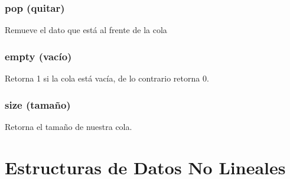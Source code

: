 \documentclass[letterpaper,10pt,spanish]{sphinxmanual}
\begin{document}
\subsubsection{pop (quitar)}
\label{\detokenize{edd/lineales:id2}}
Remueve el dato que está al frente de la cola

\begin{sphinxVerbatim}[commandchars=\\\{\},numbers=left,firstnumber=1,stepnumber=1]
\end{sphinxVerbatim}


\subsubsection{empty (vacío)}
\label{\detokenize{edd/lineales:id3}}
Retorna 1 si la cola está vacía, de lo contrario retorna 0.

\begin{sphinxVerbatim}[commandchars=\\\{\},numbers=left,firstnumber=1,stepnumber=1]
\end{sphinxVerbatim}


\subsubsection{size (tamaño)}
\label{\detokenize{edd/lineales:id4}}
Retorna el tamaño de nuestra cola.

\begin{sphinxVerbatim}[commandchars=\\\{\},numbers=left,firstnumber=1,stepnumber=1]
\end{sphinxVerbatim}


\section{Estructuras de Datos No Lineales}
\label{\detokenize{edd/no_lineales:estructuras-de-datos-no-lineales}}\label{\detokenize{edd/no_lineales::doc}}
\end{document}
